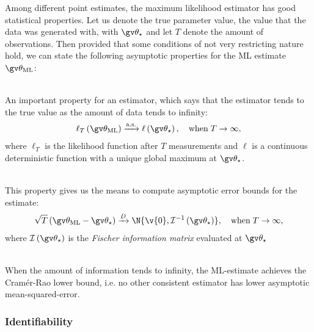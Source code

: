 Among different point estimates, the maximum likelihood estimator has good statistical properties.
Let us denote the true parameter value, the value that the data was generated with, with $\Th_\star$ and 
let $T$ denote the amount of observations.
Then provided that some conditions of not very restricting nature hold, we can state the following asymptotic properties 
for the ML estimate $\Th_{\text{ML}}$:
\begin{description}
\addtolength{\leftskip}{1cm}
\item[Strong consistency]\hfill\\
An important property for an estimator, which says that
the estimator tends to the true value as the amount of data tends to infinity:
\begin{align}
	\ell_T\left(\Th_{\text{ML}}\right) \xrightarrow{\mathrm{a.s.}} \ell\left(\Th_\star\right),\quad \mathrm{when}\;T\to\infty,
\end{align}
where $\ell_T$ is the likelihood function after $T$ measurements and $\ell$ is a continuous
deterministic function with a unique global maximum at $\Th_\star$.
\item[Asymptotic normality]\hfill\\
This property gives us the means to compute asymptotic error bounds for
the estimate:
\begin{align}
	\sqrt{T}\left(\Th_{\text{ML}}-\Th_\star\right) \xrightarrow{D} \N{\v{0},\mathcal{I}^{-1}\left(\Th_\star\right)},\quad \mathrm{when}\;T\to\infty,
	\label{tablelabel}
\end{align}
where $\mathcal{I}\left(\Th_\star\right)$ is the \emph{Fischer information matrix} evaluated at $\Th_\star$ 
\item[Efficiency]\hfill\\
When the amount of information tends to infinity, the ML-estimate achieves
the Cramér-Rao lower bound, i.e. no other consistent estimator has lower asymptotic mean-squared-error.
\end{description}


\subsubsection{Identifiability}

